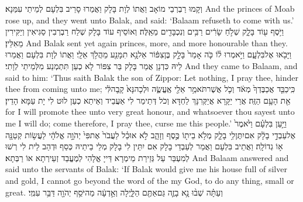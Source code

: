 {וְקָמוּ רַבְרְבֵי מוֹאָב וַאֲתוֹ לְוָת בָּלָק וַאֲמַרוּ סָרֵיב בִּלְעָם לְמֵיתֵי עִמַּנָא׃}
{And the princes of Moab rose up, and they went unto Balak, and said: ‘Balaam refuseth to come with us.’}{}
{וַיֹּ֥סֶף ע֖וֹד בָּלָ֑ק שְׁלֹ֣חַ שָׂרִ֔ים רַבִּ֥ים וְנִכְבָּדִ֖ים מֵאֵֽלֶּה׃}
{וְאוֹסֵיף עוֹד בָּלָק שְׁלַח רַבְרְבִין סַגִּיאִין וְיַקִּירִין מֵאִלֵּין׃}
{And Balak sent yet again princes, more, and more honourable than they.}{}
{וַיָּבֹ֖אוּ אֶל\maqqaf בִּלְעָ֑ם וַיֹּ֣אמְרוּ ל֗וֹ כֹּ֤ה אָמַר֙ בָּלָ֣ק בֶּן\maqqaf צִפּ֔וֹר אַל\maqqaf נָ֥א תִמָּנַ֖ע מֵהֲלֹ֥ךְ אֵלָֽי׃}
{וַאֲתוֹ לְוָת בִּלְעָם וַאֲמַרוּ לֵיהּ כִּדְנָן אֲמַר בָּלָק בַּר צִפּוֹר לָא כְעַן תִּתְמְנַע מִלְּמֵיתֵי לְוָתִי׃}
{And they came to Balaam, and said to him: ‘Thus saith Balak the son of Zippor: Let nothing, I pray thee, hinder thee from coming unto me;}{}
{כִּֽי\maqqaf כַבֵּ֤ד אֲכַבֶּדְךָ֙ מְאֹ֔ד וְכֹ֛ל אֲשֶׁר\maqqaf תֹּאמַ֥ר אֵלַ֖י אֶֽעֱשֶׂ֑ה וּלְכָה\maqqaf נָּא֙ קָֽבָה\maqqaf לִּ֔י אֵ֖ת הָעָ֥ם הַזֶּֽה׃}
{אֲרֵי יַקָּרָא אֲיַקְּרִנָּךְ לַחְדָּא וְכֹל דְּתֵימַר לִי אַעֲבֵיד וְאֵיתַא כְעַן לוּט לִי יָת עַמָּא הָדֵין׃}
{for I will promote thee unto very great honour, and whatsoever thou sayest unto me I will do; come therefore, I pray thee, curse me this people.’}{}
{וַיַּ֣עַן בִּלְעָ֗ם וַיֹּ֙אמֶר֙ אֶל\maqqaf עַבְדֵ֣י בָלָ֔ק אִם\maqqaf יִתֶּן\maqqaf לִ֥י בָלָ֛ק מְלֹ֥א בֵית֖וֹ כֶּ֣סֶף וְזָהָ֑ב לֹ֣א אוּכַ֗ל לַעֲבֹר֙ אֶת\maqqaf פִּי֙ יְהֹוָ֣ה אֱלֹהָ֔י לַעֲשׂ֥וֹת קְטַנָּ֖ה א֥וֹ גְדוֹלָֽה׃}
{וַאֲתֵיב בִּלְעָם וַאֲמַר לְעַבְדֵי בָלָק אִם יִתֵּין לִי בָלָק מְלֵי בֵיתֵיהּ כְּסַף וּדְהַב לֵית לִי רְשׁוּ לְמִעְבַּר עַל גְּזֵירַת מֵימְרָא דַּייָ אֱלָהִי לְמֶעֱבַד זְעֵירְתָא אוֹ רַבְּתָא׃}
{And Balaam answered and said unto the servants of Balak: ‘If Balak would give me his house full of silver and gold, I cannot go beyond the word of the \lord\space my God, to do any thing, small or great.}{}
{וְעַתָּ֗ה שְׁב֨וּ נָ֥א בָזֶ֛ה גַּם\maqqaf אַתֶּ֖ם הַלָּ֑יְלָה וְאֵ֣דְעָ֔ה מַה\maqqaf יֹּסֵ֥ף יְהֹוָ֖ה דַּבֵּ֥ר עִמִּֽי׃}
